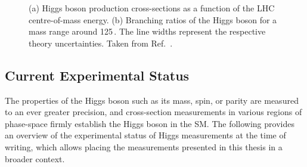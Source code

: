 \captionsetup[subfloat]{captionskip=5pt} %




\captionsetup[subfloat]{captionskip=5pt} %
\begin{figure}
  \begin{center}
  \end{center}
  \caption[(a) Higgs boson production cross-sections as a function of the LHC centre-of-mass energy. (b) Branching ratios of the Higgs boson for a mass range around 125\,\GeV.]{(a) Higgs boson production cross-sections as a function of the LHC centre-of-mass energy. (b) Branching ratios of the Higgs boson for a mass range around 125\,\GeV. The line widths represent the respective theory uncertainties. Taken from Ref.~\cite{YR4}.}
\end{figure}





\subsection{Current Experimental Status}

The properties of the Higgs boson such as its mass, spin, or parity are measured to an ever greater precision, and cross-section measurements in various regions of phase-space firmly establish the Higgs boson in the SM. 
The following provides an overview of the experimental status of Higgs measurements at the time of writing, which allows placing the measurements presented in this thesis in a broader context. 

